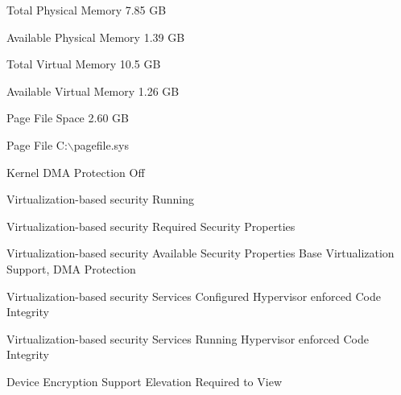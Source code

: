 \documentclass[a4paper]{report}
\begin{document}
\par
Total Physical Memory	7.85 GB	
\par
Available Physical Memory	1.39 GB	
\par
Total Virtual Memory	10.5 GB	
\par
Available Virtual Memory	1.26 GB	
\par
Page File Space	2.60 GB	
\par
Page File	C:$\backslash$pagefile.sys	
\par
Kernel DMA Protection	Off	
\par
Virtualization-based security	Running	
\par
Virtualization-based security Required Security Properties		
\par
Virtualization-based security Available Security Properties	 Base Virtualization Support, DMA Protection
\par	
Virtualization-based security Services Configured	Hypervisor enforced Code Integrity	
\par
Virtualization-based security Services Running	Hypervisor enforced Code Integrity	
\par
Device Encryption Support	Elevation Required to View	
\par
\end{document}
